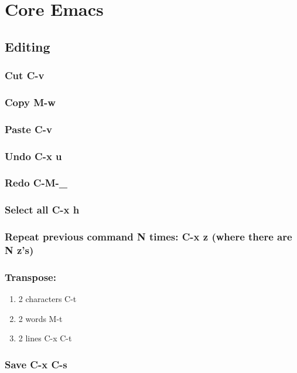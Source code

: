 \documentclass[11pt]{article}
\author{Peter Bouman}
\date{\today}
\title{}
\begin{document}
\tableofcontents

\section{Core Emacs}
\label{sec:org723bed6}
\subsection{Editing}
\label{sec:org686d583}
\subsubsection{Cut C-v}
\label{sec:org6b1e193}
\subsubsection{Copy M-w}
\label{sec:org724575b}
\subsubsection{Paste C-v}
\label{sec:org3220b22}
\subsubsection{Undo C-x u}
\label{sec:org716fad9}
\subsubsection{Redo C-M-\_}
\label{sec:orgc0df443}
\subsubsection{Select all C-x h}
\label{sec:org796fc94}
\subsubsection{Repeat previous command N times: C-x z (where there are N z's)}
\label{sec:orgdc61457}
\subsubsection{Transpose:}
\label{sec:orgd49b216}
\begin{enumerate}
\item 2 characters C-t
\label{sec:orgc6b0ccd}
\item 2 words M-t
\label{sec:org3209614}
\item 2 lines  C-x C-t
\label{sec:org6ff7817}
\end{enumerate}
\subsubsection{Save C-x C-s}
\label{sec:org059d29c}
\end{document}
